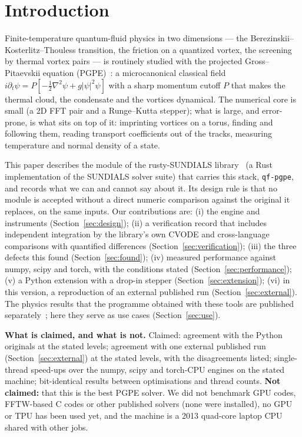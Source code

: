 \documentclass[11pt,a4paper]{article}
\begin{document}
\section{Introduction}

Finite-temperature quantum-fluid physics in two dimensions --- the Berezinskii--Kosterlitz--Thouless transition, the friction on a quantized vortex, the screening
by thermal vortex pairs --- is routinely studied with the projected Gross--Pitaevskii equation (PGPE)~\cite{Davis2001,Blakie2008}: a microcanonical classical field
$i\partial_t\psi=P[-\tfrac12\nabla^2\psi+g|\psi|^2\psi]$ with a sharp momentum cutoff $P$ that makes the thermal cloud, the condensate and the vortices
dynamical. The numerical core is small (a 2D FFT pair and a Runge--Kutta stepper); what is large, and error-prone, is what sits on top of it: imprinting vortices on a torus,
finding and following them, reading transport coefficients out of the tracks, measuring temperature and normal density of a state.

This paper describes the module of the rusty-SUNDIALS library~\cite{Hindmarsh2005} (a Rust implementation of the SUNDIALS solver suite) that carries this stack, \texttt{qf-pgpe},
and records what we can and cannot say about it. Its design rule is that no module is accepted without a direct numeric comparison against the original it replaces, on
the same inputs. Our contributions are: (i) the engine and instruments (Section~\ref{sec:design}); (ii) a verification record that includes independent integration by the library's own CVODE and
cross-language comparisons with quantified differences (Section~\ref{sec:verification}); (iii) the three defects this found (Section~\ref{sec:found}); (iv) measured performance against numpy, scipy and torch, with the conditions stated
(Section~\ref{sec:performance}); (v) a Python extension with a drop-in stepper (Section~\ref{sec:extension}); (vi) in this version, a reproduction of an external published run (Section~\ref{sec:external}). The physics results that the programme obtained with these tools are
published separately~\cite{Callens2026a,Callens2026b,Callens2026sw}; here they serve as use cases (Section~\ref{sec:use}).

\begin{keybox}
\textbf{What is claimed, and what is not.} Claimed: agreement with the Python originals at the stated levels; agreement with one external published run (Section~\ref{sec:external}) at the stated levels, with the disagreements listed; single-thread speed-ups over the numpy, scipy and torch-CPU engines on the
stated machine; bit-identical results between optimisations and thread counts. \textbf{Not claimed:} that this is the best PGPE solver. We did not benchmark GPU codes, FFTW-based C codes or other published
solvers (none were installed), no GPU or TPU has been used yet, and the machine is a 2013 quad-core laptop CPU shared with other jobs.
\end{keybox}
\end{document}
